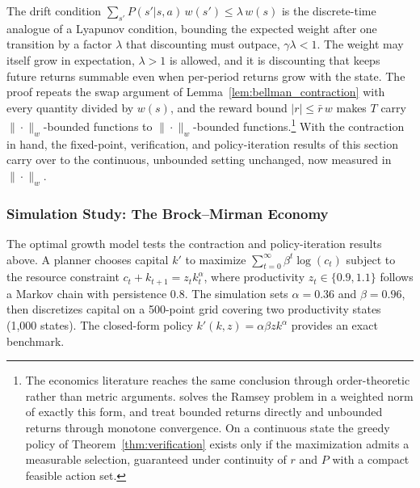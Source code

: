 The drift condition $\sum_{s'} P(s'|s,a)\, w(s') \leq \lambda\, w(s)$ is the discrete-time analogue of a Lyapunov condition, bounding the expected weight after one transition by a factor $\lambda$ that discounting must outpace, $\gamma\lambda < 1$. The weight may itself grow in expectation, $\lambda > 1$ is allowed, and it is discounting that keeps future returns summable even when per-period returns grow with the state. The proof repeats the swap argument of Lemma~\ref{lem:bellman_contraction} with every quantity divided by $w(s)$, and the reward bound $|r| \leq \bar{r}\, w$ makes $T$ carry $\|\cdot\|_w$-bounded functions to $\|\cdot\|_w$-bounded functions.\footnote{The economics literature reaches the same conclusion through order-theoretic rather than metric arguments. \citet{boyd1990} solves the Ramsey problem in a weighted norm of exactly this form, and \citet{stokey1989} treat bounded returns directly and unbounded returns through monotone convergence. On a continuous state the greedy policy of Theorem~\ref{thm:verification} exists only if the maximization admits a measurable selection, guaranteed under continuity of $r$ and $P$ with a compact feasible action set.} With the contraction in hand, the fixed-point, verification, and policy-iteration results of this section carry over to the continuous, unbounded setting unchanged, now measured in $\|\cdot\|_w$.

\subsubsection{Simulation Study: The Brock--Mirman Economy}
\label{sec:brock_mirman_sim}

The \citet{brockmirman1972} optimal growth model tests the contraction and policy-iteration results above. A planner chooses capital $k'$ to maximize $\sum_{t=0}^\infty \beta^t \log(c_t)$ subject to the resource constraint $c_t + k_{t+1} = z_t k_t^\alpha$, where productivity $z_t \in \{0.9, 1.1\}$ follows a Markov chain with persistence 0.8. The simulation sets $\alpha = 0.36$ and $\beta = 0.96$, then discretizes capital on a 500-point grid covering two productivity states (1,000 states). The closed-form policy $k'(k,z) = \alpha\beta z k^\alpha$ provides an exact benchmark.

